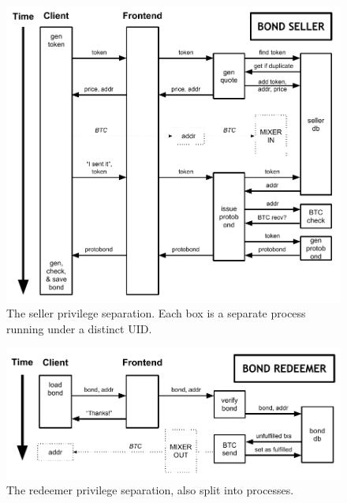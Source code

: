 \documentclass[12pt]{article}
\begin{document}
\begin{figure}[ht]
\begin{center}
\includegraphics[width=14cm]{dryer21-bond-seller-diagram.pdf}
\end{center}
\caption{The seller privilege separation. Each box is a separate process running under a distinct UID.\label{seller}}
\end{figure}
\begin{figure}[ht]
\begin{center}
\includegraphics[width=14cm]{dryer21-bond-redeemer-diagram.pdf}
\end{center}
\caption{The redeemer privilege separation, also split into processes.\label{seller}}
\end{figure}
\end{document}
